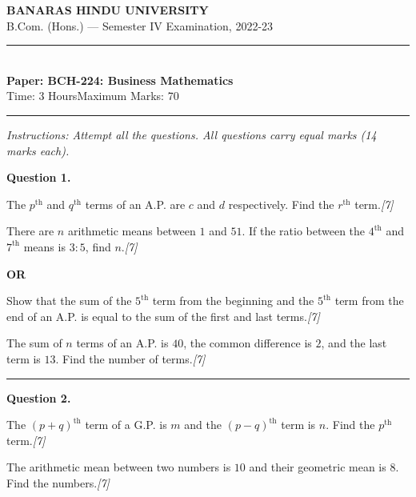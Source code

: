 \documentclass[11pt,a4paper]{article}
\newcommand{\pts}[1]{\hfill   \textit{[#1]}}
\begin{document}
\begin{center}
  {\large\bfseries BANARAS HINDU UNIVERSITY}\\[2pt]
  {\normalsize B.Com. (Hons.) --- Semester IV Examination, 2022-23}\\[6pt]
  \rule{0.8\linewidth}{0.5pt}\\[6pt]
  {\large\bfseries Paper: BCH-224: Business Mathematics}\\[4pt]
  {\normalsize Time: 3 Hours\hfill Maximum Marks: 70}
\end{center}

\rule{\linewidth}{0.4pt}

\smallskip



\noindent   \textit{Instructions: Attempt all the questions. All questions carry equal marks (14 marks each).}

\bigskip




\noindent   \textbf{Question 1.}

\begin{parts}
  \item The $p^{ \text{th}}$ and $q^{ \text{th}}$ terms of an A.P. are $c$ and $d$ respectively. Find the $r^{ \text{th}}$ term.\pts{7}
  \item There are $n$ arithmetic means between $1$ and $51$. If the ratio between the $4^{ \text{th}}$ and $7^{ \text{th}}$ means is $3:5$, find $n$.\pts{7}
\end{parts}

\centerline{   \textbf{OR}}


\begin{parts}
  \item Show that the sum of the $5^{ \text{th}}$ term from the beginning and the $5^{ \text{th}}$ term from the end of an A.P. is equal to the sum of the first and last terms.\pts{7}
  \item The sum of $n$ terms of an A.P. is $40$, the common difference is $2$, and the last term is $13$. Find the number of terms.\pts{7}
\end{parts}

\medskip\rule{\linewidth}{0.2pt}




\noindent   \textbf{Question 2.}

\begin{parts}
  \item The $(p + q)^{ \text{th}}$ term of a G.P. is $m$ and the $(p - q)^{ \text{th}}$ term is $n$. Find the $p^{ \text{th}}$ term.\pts{7}
  \item The arithmetic mean between two numbers is $10$ and their geometric mean is $8$. Find the numbers.\pts{7}
\end{parts}
\end{document}
